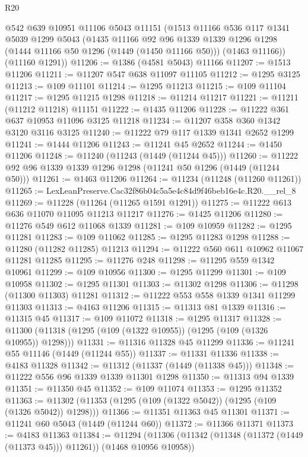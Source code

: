 \begin{lexlean}{R20}
\begin{coremodule}
    @542
    @639
    @10951
    @11106
    @5043
    @11151
    (@1513
      @11166
      @536
      @117
      @1341
      @5039
      @1299
      @5043
      (@1435
        @11166
        @92
        @96
        @1339
        @1339
        @1296
        @1298
        (@1444 @11166 @50 @1296 (@1449 (@1450 @11166 @50)))
        (@1463 @11166))
      (@11160 @1291))
@11206 := @1386 (@4581 @5043) @11166
@11207 := @1513 @11206
@11211 := @11207 @547 @638 @11097 @11105
@11212 := @1295 @3125
@11213 := @109 @11101
@11214 := @1295 @11213
@11215 := @109 @11104
@11217 := @1295 @11215 @1298
@11218 := @11214 @11217
@11221 := @11211 (@11212 @11218) @11151
@11222 := @1435 @11206
@11228 := @11222 @361 @637 @10953 @11096 @3125 @11218
@11234 := @11207 @358 @360 @1342 @3120 @3116 @3125
@11240 := @11222 @79 @117 @1339 @1341 @2652 @1299
@11241 := @1444 @11206
@11243 := @11241 @45 @2652
@11244 := @1450 @11206
@11248 := @11240 (@11243 (@1449 (@11244 @45)))
@11260 := @11222 @92 @96 @1339 @1339 @1296 @1298 (@11241 @50 @1296 (@1449 (@11244 @50)))
@11261 := @1463 @11206
@11264 := @11234 (@11248 (@11260 @11261))
@11265 := LexLeanPreserve.Cac32f86b04c5a5e4c84d9f46beb16e4c.R20.__rel_8
@11269 := @11228 (@11264 (@11265 @1591 @1291))
@11275 := @11222 @613 @636 @11070 @11095 @11213 @11217
@11276 := @1425 @11206
@11280 := @11276 @549 @612 @11068 @1339
@11281 := @109 @10959
@11282 := @1295 @11281
@11283 := @109 @11062
@11285 := @1295 @11283 @1298
@11288 := @11280 (@11282 @11285) @11213
@11294 := @11222 @560 @611 @10962 @11067 @11281 @11285
@11295 := @11276 @248
@11298 := @11295 @559 @1342 @10961
@11299 := @109 @10956
@11300 := @1295 @11299
@11301 := @109 @10958
@11302 := @1295 @11301
@11303 := @11302 @1298
@11306 := @11298 (@11300 @11303) @11281
@11312 := @11222 @553 @558 @1339 @1341 @11299 @11303
@11313 := @4163 @11206
@11315 := @11313 @81 @1339
@11316 := @11315 @45
@11317 := @109 @11072
@11318 := @1295 @11317
@11328 := @11300 (@11318 (@1295 (@109 (@1322 @10955)) (@1295 (@109 (@1326 @10955)) @1298)))
@11331 := @11316 @11328 @45 @11299
@11336 := @11241 @55 @11146 (@1449 (@11244 @55))
@11337 := @11331 @11336
@11338 := @4183 @11328
@11342 := @11312 (@11337 (@1449 (@11338 @45)))
@11348 := @11222 @556 @96 @1339 @1339 @11301 @1298
@11350 := @11313 @94 @1339
@11351 := @11350 @45
@11352 := @109 @11074
@11353 := @1295 @11352
@11363 := @11302 (@11353 (@1295 (@109 (@1322 @5042)) (@1295 (@109 (@1326 @5042)) @1298)))
@11366 := @11351 @11363 @45 @11301
@11371 := @11241 @60 @5043 (@1449 (@11244 @60))
@11372 := @11366 @11371
@11373 := @4183 @11363
@11384 := @11294
    (@11306 (@11342 (@11348 (@11372 (@1449 (@11373 @45))) @11261)) (@1468 @10956 @10958))

\end{coremodule}
\end{lexlean}
